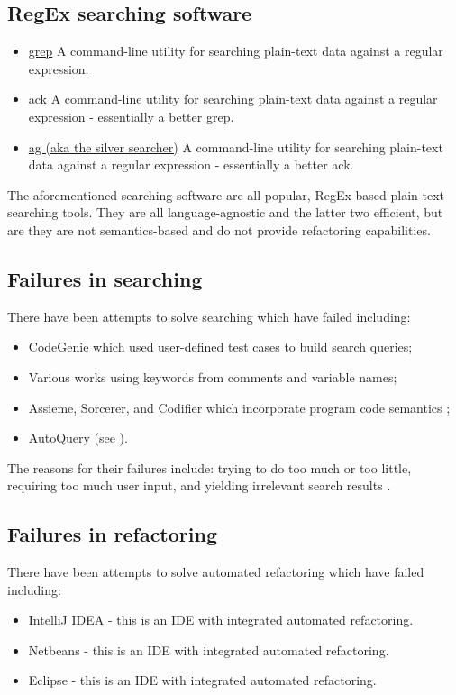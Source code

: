 \documentclass[12pt, letterpaper]{article}
\begin{document}
\subsection{RegEx searching software}
\begin{itemize}
  \item \href{https://en.wikipedia.org/wiki/Grep}{grep}\newline
  A command-line utility for searching plain-text data against a regular expression.
  \item \href{https://beyondgrep.com/}{ack}\newline
  A command-line utility for searching plain-text data against a regular expression - essentially a better grep.
  \item \href{https://github.com/ggreer/the_silver_searcher}{ag (aka the silver searcher)}\newline
  A command-line utility for searching plain-text data against a regular expression - essentially a better ack.
\end{itemize}

The aforementioned searching software are all popular, RegEx based plain-text searching tools.
They are all language-agnostic and the latter two efficient, but are they are not semantics-based and do not provide refactoring capabilities.

\subsection{Failures in searching}
There have been attempts to solve searching which have failed including:
\begin{itemize}
  \item CodeGenie which used user-defined test cases to build search queries;
  \item Various works using keywords from comments and variable names;
  \item Assieme, Sorcerer, and Codifier which incorporate program code semantics \autocite{reiss2009semantics};
  \item AutoQuery (see ).
\end{itemize}

The reasons for their failures include: trying to do too much or too little, requiring too much user input, and yielding irrelevant search results \autocite{reiss2009semantics,stolee2014solving}.

\subsection{Failures in refactoring}
There have been attempts to solve automated refactoring which have failed including:
\begin{itemize}
  \item IntelliJ IDEA - this is an IDE with integrated automated refactoring.
  \item Netbeans - this is an IDE with integrated automated refactoring.
  \item Eclipse - this is an IDE with integrated automated refactoring.
\end{itemize}
\end{document}
